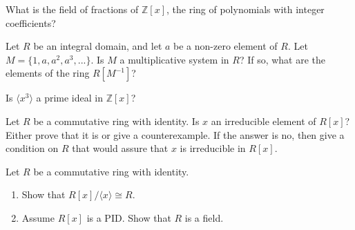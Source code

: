 \documentclass[12pt,letterpaper,boxed]{hmcpset}
\begin{document}

\begin{problem}[17.1.4]
What is the field of fractions of $\mathbb{Z}[x]$, the ring of polynomials with integer coefficients?
\end{problem}

\begin{solution}
\end{solution}

\clearpage

\begin{problem}[17.1.12]
Let $R$ be an integral domain, and let $a$ be a non-zero element of $R$. Let $M = \{1, a, a^2, a^3,...\}$. Is $M$ a multiplicative system in $R$? If so, what are the elements of the ring $R[M^{-1}]$?
\end{problem}

\begin{solution}
\end{solution}

\clearpage

\begin{problem}[18.1.6]
Is $\langle x^3 \rangle$ a prime ideal in $\mathbb{Z}[x]$?
\end{problem}

\begin{solution}
\end{solution}

\clearpage

\begin{problem}[18.1.8]
Let $R$ be a commutative ring with identity. Is $x$ an irreducible element of $R[x]$? Either prove that it is or give a counterexample. If the answer is no, then give a condition on $R$ that would assure that $x$ is irreducible in $R[x]$.
\end{problem}

\begin{solution}
\end{solution}

\clearpage

\begin{problem}[18.1.13]
Let $R$ be a commutative ring with identity.
\begin{enumerate}[label=\alph*]
\item Show that $R[x] / \langle x \rangle \cong R$.
\item Assume $R[x]$ is a PID. Show that $R$ is a field.
\end{enumerate}
\end{problem}

\begin{solution}
\end{solution}
\end{document}
